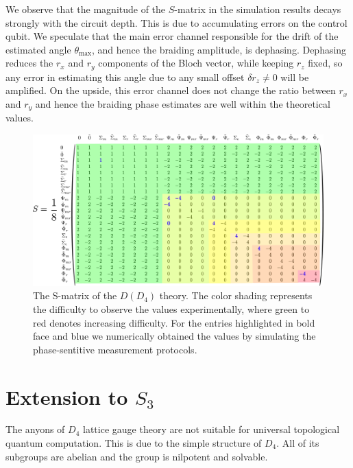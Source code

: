 \documentclass[a4paper,twocolumn,11pt, accepted=2024-06-14]{quantumarticle}
\begin{document}
We observe that the magnitude of the $S$-matrix in the simulation results decays strongly with the circuit depth. This is due to accumulating errors on the control qubit. We speculate that the main error channel responsible for the drift of the estimated angle $\theta_{\text{max}}$, and hence the braiding amplitude, is dephasing. Dephasing reduces the $r_x$ and $r_y$ components of the Bloch vector, while keeping $r_z$ fixed, so any error in estimating this angle due to any small offset $\delta r_z \neq 0$ will be amplified. On the upside, this error channel does not change the ratio between $r_x$ and $r_y$ and hence the braiding phase estimates are well within the theoretical values.



 



\begin{figure}
	\centering
	\includegraphics[width=\textwidth]{Figures/S_mat_with_diff.pdf}
	\caption{The S-matrix of the $D(D_4)$ theory. The color shading represents the difficulty to observe the values experimentally, where green to red denotes increasing difficulty. For the entries highlighted in bold face and blue we numerically obtained the values by simulating the phase-sentitive measurement protocols.}
	\label{fig:Smat_diff}
\end{figure}

\section{Extension to $S_3$}\label{sec:other_gauge}

The anyons of $D_4$ lattice gauge theory are not suitable for universal topological quantum computation.
This is due to the simple structure of $D_4$. All of its subgroups are abelian and the group is nilpotent and solvable. 
\end{document}
